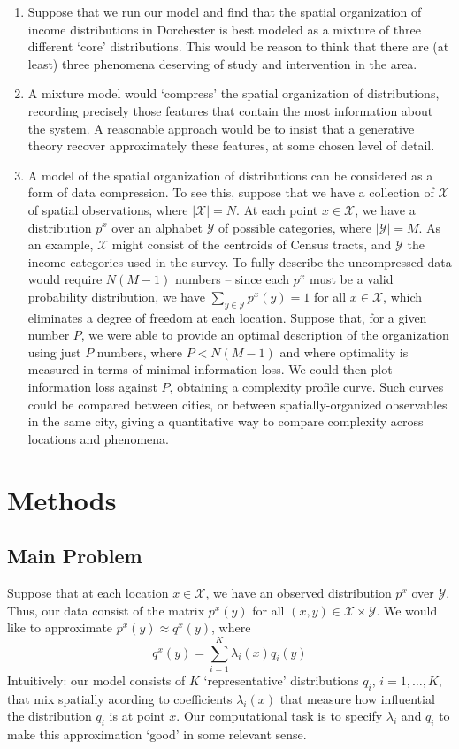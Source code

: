 \documentclass[english]{scrartcl}
\newcommand\abs[1]{\left|#1\right|}
\begin{document}
		\begin{enumerate}
			\item Suppose that we run our model and find that the spatial organization of income distributions in Dorchester is best modeled as a mixture of three different `core' distributions. This would be reason to think that there are (at least) three phenomena deserving of study and intervention in the area. 
			\item A mixture model would `compress' the spatial organization of distributions, recording precisely those features that contain the most information about the system. A reasonable approach would be to insist that a generative theory recover approximately these features, at some chosen level of detail. 
			\item A model of the spatial organization of distributions can be considered as a form of data compression. To see this, suppose that we have a collection of $\mathcal{X}$ of spatial observations, where $\abs{\mathcal{X}} = N$. At each point $x\in \mathcal{X}$, we have a distribution $p^x$ over an alphabet $\mathcal{Y}$ of possible categories, where $\abs{\mathcal{Y}} = M$. As an example, $\mathcal{X}$ might consist of the centroids of Census tracts, and $\mathcal{Y}$ the income categories used in the survey. To fully describe the uncompressed data would require $N(M-1)$ numbers -- since each $p^x$ must be a valid probability distribution, we have $\sum_{y\in \mathcal{Y}} p^x(y) = 1$ for all $x\in \mathcal{X}$, which eliminates a degree of freedom at each location. Suppose that, for a given number $P$, we were able to provide an optimal description of the organization using just $P$ numbers, where $P < N(M-1)$ and where optimality is measured in terms of minimal information loss. We could then plot information loss against $P$, obtaining a complexity profile curve. Such curves could be compared between cities, or between spatially-organized observables in the same city, giving a quantitative way to compare complexity across locations and phenomena. 
		\end{enumerate} 




\section{Methods}
	\subsection{Main Problem}
		Suppose that at each location $x \in \mathcal{X}$, we have an observed distribution $p^x$ over $\mathcal{Y}$. Thus, our data consist of the matrix $p^x(y)$ for all $(x,y) \in \mathcal{X} \times \mathcal{Y}$. We would like to approximate $p^x(y) \approx q^x(y)$, where 
		\begin{equation}
			q^x(y) = \sum_{i=1}^K \lambda_i(x) q_i(y)
		\end{equation}
		Intuitively: our model consists of $K$ `representative' distributions $q_i$, $i = 1,\ldots,K$, that mix spatially acording to coefficients $\lambda_i(x)$ that measure how influential the distribution $q_i$ is at point $x$. Our computational task is to specify $\lambda_i$ and $q_i$ to make this approximation `good' in some relevant sense. 
\end{document}
